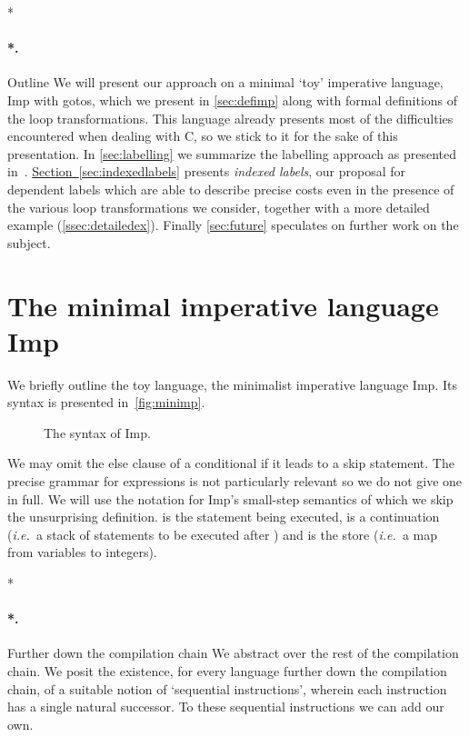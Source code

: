 \documentclass[submission,copyright,creativecommons]{eptcs}
\makeatletter
\theoremstyle{definition}
\newcommand{\s}[1]{{\sf #1}}    \newcommand{\vc}[1]{{\bf #1}}
\newcommand{\imp}{{\sf Imp}}            \newcommand{\vm}{{\sf Vm}}              \newcommand{\mips}{{\sf Mips}}          \newcommand{\Clight}{{\sf Clight}}        \newcommand{\Cminor}{{\sf Cminor}}
\newcommand{\ie}{\emph{i.e.\ }}
\let\oldparagraph\paragraph
\def\paragraph{\@ifnextchar*\new@paragraph@star\new@paragraph}
\def\new@paragraph@star*#1{\oldparagraph*{#1.}}
\def\new@paragraph#1{\oldparagraph{#1.}}
\makeatother
\begin{document}
\paragraph*{Outline}
We will present our approach on a minimal `toy' imperative language, \imp{} with \s{goto}s, which we present in \autoref{sec:defimp} along with formal definitions of the loop transformations.
This language already presents most of the difficulties encountered when dealing with C,
so we stick to it for the sake of this presentation.
In \autoref{sec:labelling} we summarize the labelling approach as presented in~\cite{labeling}.
\hyperref[sec:indexedlabels]{Section~\ref*{sec:indexedlabels}} presents \emph{indexed labels}, our proposal for dependent labels which are able to describe precise costs even in the presence of the various loop transformations we consider, together with a more detailed example
(\autoref{ssec:detailedex}).
Finally \autoref{sec:future} speculates on further work on the subject.

\section{The minimal imperative language \imp{}}\label{sec:defimp}
We briefly outline the toy language, the minimalist imperative language \imp{}.
Its syntax
is presented in~\autoref{fig:minimp}.
\begin{figure}

\caption{The syntax
of \imp.}
\label{fig:minimp}
\end{figure}
We may omit the \s{else} clause of a conditional if it leads to a \s{skip} statement.
The precise grammar for expressions is not particularly relevant so we do not give one in full.
We will use the notation
 for \imp's small-step semantics
of which we skip the unsurprising definition.
 is the statement being executed,
 is a continuation (\ie a stack of statements to be executed after )
and  is the store (\ie a map from variables to integers).


\paragraph*{Further down the compilation chain}
We abstract over the rest of the compilation chain.
We posit the existence, for every language  further down the compilation chain, of a suitable notion of `sequential instructions', wherein each instruction has a single natural successor. To these sequential instructions we can add our own.
\end{document}

